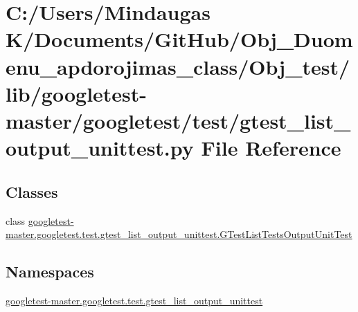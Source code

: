 \hypertarget{_obj__test_2lib_2googletest-master_2googletest_2test_2gtest__list__output__unittest_8py}{}\section{C\+:/\+Users/\+Mindaugas K/\+Documents/\+Git\+Hub/\+Obj\+\_\+\+Duomenu\+\_\+apdorojimas\+\_\+class/\+Obj\+\_\+test/lib/googletest-\/master/googletest/test/gtest\+\_\+list\+\_\+output\+\_\+unittest.py File Reference}
\label{_obj__test_2lib_2googletest-master_2googletest_2test_2gtest__list__output__unittest_8py}
\subsection*{Classes}
\begin{DoxyCompactItemize}
\item 
class \mbox{\hyperlink{classgoogletest-master_1_1googletest_1_1test_1_1gtest__list__output__unittest_1_1_g_test_list_tests_output_unit_test}{googletest-\/master.\+googletest.\+test.\+gtest\+\_\+list\+\_\+output\+\_\+unittest.\+G\+Test\+List\+Tests\+Output\+Unit\+Test}}
\end{DoxyCompactItemize}
\subsection*{Namespaces}
\begin{DoxyCompactItemize}
\item 
 \mbox{\hyperlink{namespacegoogletest-master_1_1googletest_1_1test_1_1gtest__list__output__unittest}{googletest-\/master.\+googletest.\+test.\+gtest\+\_\+list\+\_\+output\+\_\+unittest}}
\end{DoxyCompactItemize}
